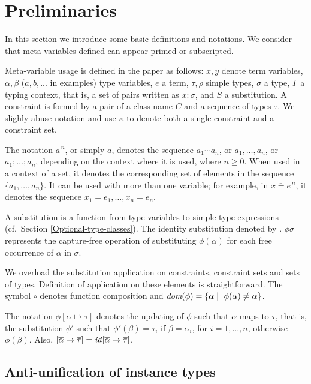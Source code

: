 \section{Preliminaries}\label{prelimirares}

In this section we introduce some basic definitions and notations. We
consider that meta-variables defined can appear primed or subscripted.

Meta-variable usage is defined in the paper as follows: $x,y$ denote
term variables, $\alpha, \beta$ ($a, b,...$
in examples) type variables, $e$ a term,
$\tau,\rho$ simple types, $\sigma$ a type, $\Gamma$ a typing context, 
that is, a set of pairs written as $x:\sigma$, and $S$ a
substitution. A constraint is formed by a pair of a class name $C$ and
a sequence of types $\overline{\tau}$. We slighly abuse notation and 
use $\kappa$ to denote both a single constraint and a constraint set.

The notation $\overline{a}^{\,n}$, or simply $\overline{a}$, denotes
the sequence $a_1 \cdots a_n$, or $a_1, \ldots, a_n$, or
$a_1;\ldots;a_n$, depending on the context where it is used, where
$n\geq 0$. When used in a context of a set, it denotes the
corresponding set of elements in the sequence $\{a_1,\ldots,a_n\}$. It
can be used with more than one variable; for example, in $\overline{x
  = e}^{\,n}$, it denotes the sequence $x_1 = e_1, \ldots, x_n = e_n$.

A substitution is a function from type variables to simple type
expressions (cf.~Section \ref{Optional-type-classes}). The identity
substitution denoted by \id. $\phi\sigma$ represents the capture-free
operation of substituting $\phi(\alpha)$ for each free occurrence of
$\alpha$ in $\sigma$.

We overload the substitution application on constraints, constraint
sets and sets of types. Definition of application on these elements is
straightforward. The symbol $\circ$ denotes function composition and
$\textit{dom}(\phi)=\{\alpha \mid\ \phi(\alpha) \neq \alpha\}$.

The notation $\phi[\overline{\alpha}\mapsto\overline{\tau}]$ denotes
the updating of $\phi$ such that $\overline{\alpha}$ maps to
$\overline{\tau}$, that is, the substitution $\phi'$ such that
$\phi'(\beta) = \tau_i$ if $\beta = \alpha_i$, for $i = 1,...,n$,
otherwise $\phi(\beta)$. Also, $[\overline{\alpha}\mapsto\overline{\tau}]
= \text{\it id\/}[\overline{\alpha}\mapsto\overline{\tau}]$.

\subsection{Anti-unification of instance types}
\label{sec:anti-unif}

